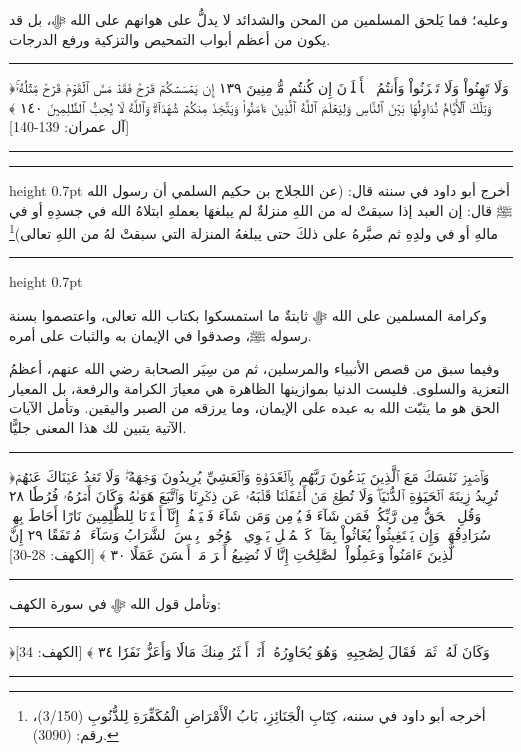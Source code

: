\documentclass[12pt,openany]{book}
\newenvironment{quranblock}
  {\par\medskip\begin{center}\begin{minipage}{0.92\linewidth}\centering\quranfont\large\color{ink}\hrule\vspace{0.65em}}
  {\vspace{0.65em}\hrule\end{minipage}\end{center}\medskip}
\newenvironment{hadithblock}
  {\par\medskip\noindent\begin{minipage}{\linewidth}\hrule height 0.7pt \vspace{0.6em}\small}
  {\vspace{0.4em}\hrule height 0.7pt\end{minipage}\par\medskip}
\begin{document}
وعليه؛ فما يَلحق المسلمين من المحن والشدائد لا يدلُّ على هوانهم على الله ﷻ، بل قد يكون من أعظم أبواب التمحيص والتزكية ورفع الدرجات.

\begin{quranblock}
﴿وَلَا تَهِنُواْ وَلَا تَحۡزَنُواْ وَأَنتُمُ ٱلۡأَعۡلَوۡنَ إِن كُنتُم مُّؤۡمِنِينَ ١٣٩ إِن يَمۡسَسۡكُمۡ قَرۡحٞ فَقَدۡ مَسَّ ٱلۡقَوۡمَ قَرۡحٞ مِّثۡلُهُۥۚ وَتِلۡكَ ٱلۡأَيَّامُ نُدَاوِلُهَا بَيۡنَ ٱلنَّاسِ وَلِيَعۡلَمَ ٱللَّهُ ٱلَّذِينَ ءَامَنُواْ ‌وَيَتَّخِذَ ‌مِنكُمۡ ‌شُهَدَآءَۗ وَٱللَّهُ لَا يُحِبُّ ٱلظَّٰلِمِينَ ١٤٠ ﴾ [آل عمران: 139-140]
\end{quranblock}

\begin{hadithblock}
أخرج أبو داود في سننه قال: (عن اللجلاج بن حكيم السلمي أن رسول الله ﷺ قال: إن العبد إذا سبقتْ له من اللهِ منزلةٌ لم يبلغهَا بعملهِ ابتلاهُ الله في جسدِهِ أو في مالهِ أو في ولدِهِ ثم صبَّرهُ على ذلكَ حتى يبلغهُ المنزلة التي سبقتْ لهُ من اللهِ تعالى)\footnote{أخرجه أبو داود في سننه، كِتَابِ الْجَنَائِزِ، ‌‌بَابُ الْأَمْرَاضِ الْمُكَفِّرَةِ لِلذُّنُوبِ (3/150)، رقم: (3090).}
\end{hadithblock}

وكرامة المسلمين على الله ﷻ ثابتةٌ ما استمسكوا بكتاب الله تعالى، واعتصموا بسنة رسوله ﷺ، وصدقوا في الإيمان به والثبات على أمره.

وفيما سبق من قصص الأنبياء والمرسلين، ثم من سِيَر الصحابة رضي الله عنهم، أعظمُ التعزية والسلوى. فليست الدنيا بموازينها الظاهرة هي معيارَ الكرامة والرفعة، بل المعيار الحق هو ما يثبّت الله به عبده على الإيمان، وما يرزقه من الصبر واليقين. وتأمل الآيات الآتية يتبين لك هذا المعنى جليًّا.

\begin{quranblock}
﴿وَٱصۡبِرۡ نَفۡسَكَ مَعَ ٱلَّذِينَ يَدۡعُونَ رَبَّهُم بِٱلۡغَدَوٰةِ وَٱلۡعَشِيِّ يُرِيدُونَ وَجۡهَهُۥۖ وَلَا تَعۡدُ عَيۡنَاكَ عَنۡهُمۡ تُرِيدُ زِينَةَ ٱلۡحَيَوٰةِ ٱلدُّنۡيَاۖ وَلَا تُطِعۡ مَنۡ أَغۡفَلۡنَا قَلۡبَهُۥ عَن ذِكۡرِنَا وَٱتَّبَعَ هَوَىٰهُ وَكَانَ أَمۡرُهُۥ فُرُطٗا ٢٨ وَقُلِ ٱلۡحَقُّ مِن رَّبِّكُمۡۖ فَمَن شَآءَ فَلۡيُؤۡمِن وَمَن شَآءَ فَلۡيَكۡفُرۡۚ إِنَّآ أَعۡتَدۡنَا لِلظَّٰلِمِينَ نَارًا أَحَاطَ بِهِمۡ سُرَادِقُهَاۚ وَإِن يَسۡتَغِيثُواْ يُغَاثُواْ بِمَآءٖ كَٱلۡمُهۡلِ يَشۡوِي ٱلۡوُجُوهَۚ بِئۡسَ ٱلشَّرَابُ وَسَآءَتۡ مُرۡتَفَقًا ٢٩ إِنَّ ٱلَّذِينَ ءَامَنُواْ وَعَمِلُواْ ٱلصَّٰلِحَٰتِ إِنَّا لَا نُضِيعُ أَجۡرَ مَنۡ أَحۡسَنَ عَمَلًا ٣٠ ﴾ [الكهف: 28-30]
\end{quranblock}

وتأمل قول الله ﷻ في سورة الكهف:

\begin{quranblock}
﴿وَكَانَ لَهُۥ ثَمَرٞ فَقَالَ لِصَٰحِبِهِۦ وَهُوَ يُحَاوِرُهُۥٓ أَنَا۠ أَكۡثَرُ ‌مِنكَ ‌مَالٗا وَأَعَزُّ نَفَرٗا ٣٤ ﴾ [الكهف: 34]
\end{quranblock}
\end{document}
